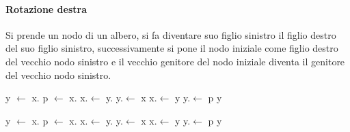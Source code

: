 \paragraph{Rotazione destra}
Si prende un nodo di un albero, si fa diventare suo figlio sinistro il figlio destro del suo figlio sinistro, successivamente si pone il nodo iniziale come
figlio destro del vecchio nodo sinistro e il vecchio genitore del nodo iniziale diventa il genitore del vecchio nodo sinistro.
\begin{multicols}{2}
\begin{algorithm}[H]
\DontPrintSemicolon
{}

\caption{\protect\Tree \protect{}}
\Tree y $\leftarrow$ x.\Right\;
\Tree p $\leftarrow$ x.\Parent\;
x.\Right $\leftarrow$ y.\Left\;
y.\Left $\leftarrow$ x\;
x.\Parent $\leftarrow$ y\;
y.\Parent $\leftarrow$ p\;
\Return y\;
\end{algorithm}
\columnbreak
\begin{algorithm}[H]
\DontPrintSemicolon
{}

\caption{\protect\Tree \protect{}}
\Tree y $\leftarrow$ x.\Left\;
\Tree p $\leftarrow$ x.\Parent\;
x.\Right $\leftarrow$ y.\Right\;
y.\Right $\leftarrow$ x\;
x.\Parent $\leftarrow$ y\;
y.\Parent $\leftarrow$ p\;
\Return y\;
\end{algorithm}
\end{multicols}

